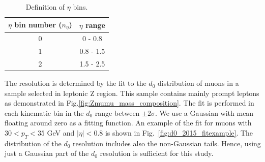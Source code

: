 \begin{table}[h]
\begin{center}
 \begin{tabular}{ c | c  } 
 \hline
 $\eta$ bin number ($n_{\eta}$) & $\eta$ range \\
 \hline
0 & 0 - 0.8 \\
1 & 0.8 - 1.5 \\
2 & 1.5 - 2.5 \\
 \hline
\end{tabular}
\caption{
    Definition of $\eta$ bins.
}%
\label{tbl:def_kinematicBinning_eta}
\end{center}
\end{table}

The resolution is determined by the fit to the $d_0$ distribution of muons in a sample selected in leptonic Z region. 
This sample contains mainly prompt leptons as demonstrated in Fig.\ref{fig:Zmumu_mass_composition}.
The fit is performed in each kinematic bin in the $d_0$ range between $\pm2\dot\sigma$.
We use a Gaussian with mean floating around zero as a fitting function.
An example of the fit for muons with $30 < p_T < 35$ GeV and $|\eta| < 0.8$ is shown in Fig.~\ref{fig:d0_2015_fitexample}.
The distribution of the $d_0$ resolution includes also the non-Gaussian tails.
Hence, using just a Gaussian part of the $d_0$ resolution is sufficient for this study.

